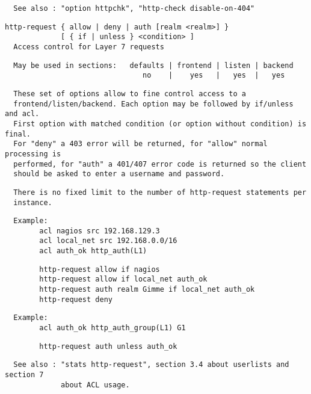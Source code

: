 \begin{verbatim}
  See also : "option httpchk", "http-check disable-on-404"
\end{verbatim}

\begin{verbatim}
http-request { allow | deny | auth [realm <realm>] }
             [ { if | unless } <condition> ]
  Access control for Layer 7 requests
\end{verbatim}

\begin{verbatim}
  May be used in sections:   defaults | frontend | listen | backend
                                no    |    yes   |   yes  |   yes
\end{verbatim}

\begin{verbatim}
  These set of options allow to fine control access to a
  frontend/listen/backend. Each option may be followed by if/unless and acl.
  First option with matched condition (or option without condition) is final.
  For "deny" a 403 error will be returned, for "allow" normal processing is
  performed, for "auth" a 401/407 error code is returned so the client
  should be asked to enter a username and password.
\end{verbatim}

\begin{verbatim}
  There is no fixed limit to the number of http-request statements per
  instance.
\end{verbatim}

\begin{verbatim}
  Example:
        acl nagios src 192.168.129.3
        acl local_net src 192.168.0.0/16
        acl auth_ok http_auth(L1)
\end{verbatim}

\begin{verbatim}
        http-request allow if nagios
        http-request allow if local_net auth_ok
        http-request auth realm Gimme if local_net auth_ok
        http-request deny
\end{verbatim}

\begin{verbatim}
  Example:
        acl auth_ok http_auth_group(L1) G1
\end{verbatim}

\begin{verbatim}
        http-request auth unless auth_ok
\end{verbatim}

\begin{verbatim}
  See also : "stats http-request", section 3.4 about userlists and section 7
             about ACL usage.
\end{verbatim}

